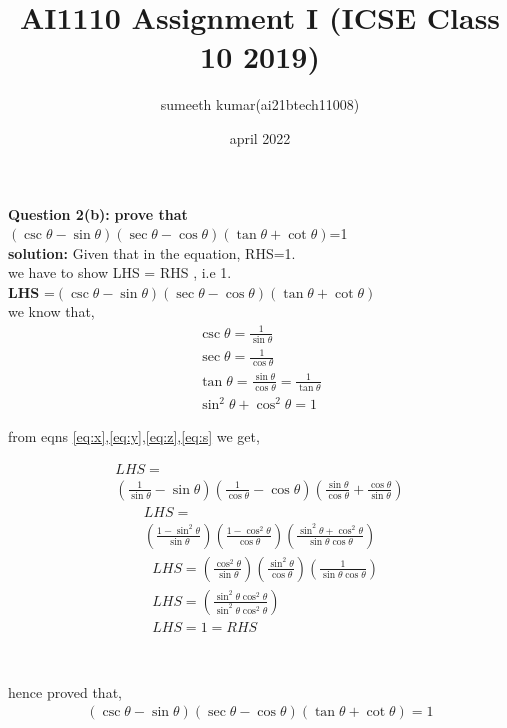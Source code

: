 \documentclass[journel,11pt,two column]{IEEEtran}
\title{AI1110 Assignment I (ICSE Class 10 2019)}
\author{sumeeth kumar(ai21btech11008)}
\date{april 2022}
\begin{document}
\maketitle
\textbf{Question 2(b):}
 \textbf{ prove that}\\
  ${(\csc \theta - \sin \theta)(\sec \theta -\cos \theta)(\tan \theta +\cot \theta)}$=1 \\  
 \textbf{solution:}   Given that in the equation, RHS=1.\\ 
 we have to show LHS = RHS , i.e 1.\\ 
 \textbf{LHS} =$(\csc \theta - \sin \theta)(\sec \theta -\cos \theta)(\tan \theta +\cot \theta)$\\
 we know that,
 \begin{align}
 \label{eq:x}
 \csc\theta=\frac{1}{\sin\theta}\\[8pt]
 \label{eq:y}
  \sec\theta = \frac{1}{\cos \theta}\\[8pt]
  \label{eq:z}
  \tan\theta = \frac{\sin\theta}{\cos\theta}=\frac{1}{\tan \theta}\\[8pt]
  \label{eq:s}
  \sin^2\theta+\cos^2\theta=1
 \end{align}
 
 \vspace{0.1cm}
 
 \begin{center}
  from eqns \eqref{eq:x},\eqref{eq:y},\eqref{eq:z},\eqref{eq:s} we get,\\[8pt]
 \end{center}
 \begin{multline}
     LHS=\\\left(\frac{1}{\sin\theta}-\sin\theta    \right)\left(\frac{1}{\cos\theta}-\cos\theta \right)\left(\frac{\sin\theta}{\cos\theta}+\frac{\cos\theta}{\sin\theta}\right)
 \end{multline}
 \begin{multline}
     LHS=\\\left(\frac{1-\sin^2\theta}{\sin\theta}\right)\left(\frac{1-\cos^2\theta}{\cos\theta}\right)\left(\frac{\sin^2\theta+\cos^2\theta}{\sin\theta \cos\theta}\right)
 \end{multline}
 \begin{align}
 &{LHS=\left(\frac{\cos^2\theta}{\sin\theta}\right)\left(\frac{\sin^2\theta}{\cos\theta}\right)\left(\frac{1}{\sin\theta \cos\theta}\right)}\\[8pt]
 &{LHS=\left(\frac{\sin^2\theta \cos^2\theta}{\sin^2\theta \cos^2\theta}\right)}\\[8pt]
 &{LHS=1=RHS}
\end{align}
\begin{center}
\\ [8pt]

\end{center}
 hence proved that,
\begin{align}
 {(\csc \theta - \sin \theta)(\sec \theta -\cos \theta)(\tan \theta +\cot \theta)}=1 
 \end{align}
\end{document}
